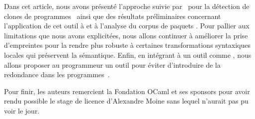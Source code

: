 Dans cet article, nous avons présenté l'approche suivie par~{\Asak} pour
la détection de clones de programmes~{\OCaml} ainsi que des résultats
préliminaires concernant l'application de cet outil à {\LearnOCaml}
et à l'analyse du corpus de paquets {\Opam}.
%
Pour pallier aux limitations que nous avons explicitées, nous allons continuer
à améliorer la prise d'empreintes pour la rendre plus robuste à certaines
transformations syntaxiques locales qui préservent la sémantique.
%
Enfin, en intégrant {\Asak} à un outil comme {\Merlin}, nous allons proposer
au programmeur un outil pour éviter d'introduire de la redondance dans
les programmes~{\OCaml}.

Pour finir, les auteurs remercient la Fondation OCaml et ses sponsors pour
avoir rendu possible le stage de licence d'Alexandre Moine sans lequel
{\Asak} n'aurait pas pu voir le jour.
